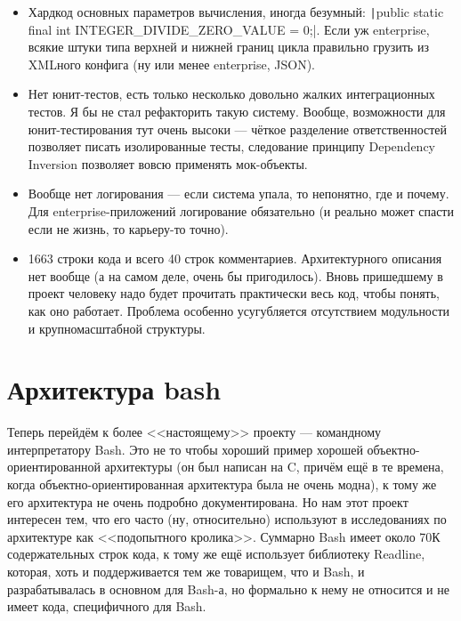 \documentclass{../text-style}
\begin{document}
\begin{itemize}
    \item Хардкод основных параметров вычисления, иногда безумный: \texttt|public static final int INTEGER_DIVIDE_ZERO_VALUE = 0;|. Если уж enterprise, всякие штуки типа верхней и нижней границ цикла правильно грузить из XMLного конфига (ну или менее enterprise, JSON).
    \item Нет юнит-тестов, есть только несколько довольно жалких интеграционных тестов. Я бы не стал рефакторить такую систему. Вообще, возможности для юнит-тестирования тут очень высоки --- чёткое разделение ответственностей позволяет писать изолированные тесты, следование принципу Dependency Inversion позволяет вовсю применять мок-объекты.
    \item Вообще нет логирования --- если система упала, то непонятно, где и почему. Для enterprise-приложений логирование обязательно (и реально может спасти если не жизнь, то карьеру-то точно).
    \item 1663 строки кода и всего 40 строк комментариев. Архитектурного описания нет вообще (а на самом деле, очень бы пригодилось). Вновь пришедшему в проект человеку надо будет прочитать практически весь код, чтобы понять, как оно работает. Проблема особенно усугубляется отсутствием модульности и крупномасштабной структуры.
\end{itemize}

\section{Архитектура bash}

Теперь перейдём к более <<настоящему>> проекту --- командному интерпретатору Bash. Это не то чтобы хороший пример хорошей объектно-ориентированной архитектуры (он был написан на C, причём ещё в те времена, когда объектно-ориентированная архитектура была не очень модна), к тому же его архитектура не очень подробно документирована. Но нам этот проект интересен тем, что его часто (ну, относительно) используют в исследованиях по архитектуре как <<подопытного кролика>>. Суммарно Bash имеет около 70К содержательных строк кода, к тому же ещё использует библиотеку Readline, которая, хоть и поддерживается тем же товарищем, что и Bash, и разрабатывалась в основном для Bash-а, но формально к нему не относится и не имеет кода, специфичного для Bash.
\end{document}
